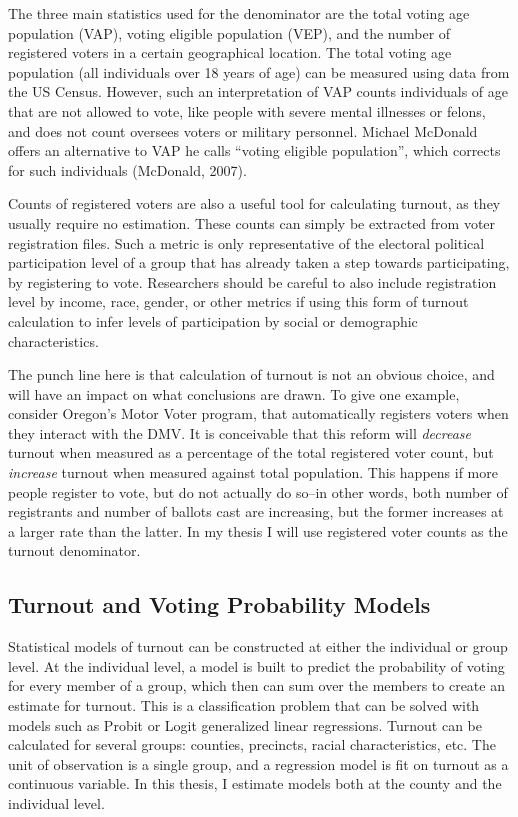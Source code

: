\documentclass[12pt,twoside]{reedthesis}
\begin{document}
  The three main statistics used for the denominator are the total voting
  age population (VAP), voting eligible population (VEP), and the number
  of registered voters in a certain geographical location. The total
  voting age population (all individuals over 18 years of age) can be
  measured using data from the US Census. However, such an interpretation
  of VAP counts individuals of age that are not allowed to vote, like
  people with severe mental illnesses or felons, and does not count
  oversees voters or military personnel. Michael McDonald offers an
  alternative to VAP he calls ``voting eligible population'', which
  corrects for such individuals (McDonald, 2007).
  
  Counts of registered voters are also a useful tool for calculating
  turnout, as they usually require no estimation. These counts can simply
  be extracted from voter registration files. Such a metric is only
  representative of the electoral political participation level of a group
  that has already taken a step towards participating, by registering to
  vote. Researchers should be careful to also include registration level
  by income, race, gender, or other metrics if using this form of turnout
  calculation to infer levels of participation by social or demographic
  characteristics.
  
  The punch line here is that calculation of turnout is not an obvious
  choice, and will have an impact on what conclusions are drawn. To give
  one example, consider Oregon's Motor Voter program, that automatically
  registers voters when they interact with the DMV. It is conceivable that
  this reform will \emph{decrease} turnout when measured as a percentage
  of the total registered voter count, but \emph{increase} turnout when
  measured against total population. This happens if more people register
  to vote, but do not actually do so--in other words, both number of
  registrants and number of ballots cast are increasing, but the former
  increases at a larger rate than the latter. In my thesis I will use
  registered voter counts as the turnout denominator.
  
  \subsection{Turnout and Voting Probability
  Models}\label{turnout-and-voting-probability-models}
  
  Statistical models of turnout can be constructed at either the
  individual or group level. At the individual level, a model is built to
  predict the probability of voting for every member of a group, which
  then can sum over the members to create an estimate for turnout. This is
  a classification problem that can be solved with models such as Probit
  or Logit generalized linear regressions. Turnout can be calculated for
  several groups: counties, precincts, racial characteristics, etc. The
  unit of observation is a single group, and a regression model is fit on
  turnout as a continuous variable. In this thesis, I estimate models both
  at the county and the individual level.
  
\end{document}
